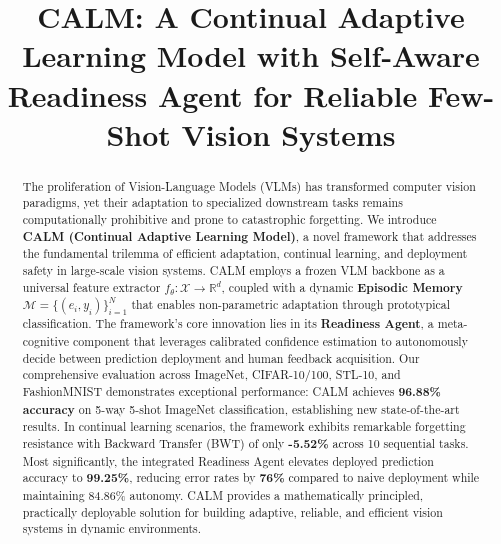 \documentclass[conference]{IEEEtran}
\begin{document}
\title{CALM: A Continual Adaptive Learning Model with Self-Aware Readiness Agent for Reliable Few-Shot Vision Systems}

\author{
\and
{}
}

\maketitle

\begin{abstract}
The proliferation of Vision-Language Models (VLMs) has transformed computer vision paradigms, yet their adaptation to specialized downstream tasks remains computationally prohibitive and prone to catastrophic forgetting. We introduce \textbf{CALM (Continual Adaptive Learning Model)}, a novel framework that addresses the fundamental trilemma of efficient adaptation, continual learning, and deployment safety in large-scale vision systems. CALM employs a frozen VLM backbone as a universal feature extractor $f_\theta: \mathcal{X} \rightarrow \mathbb{R}^d$, coupled with a dynamic \textbf{Episodic Memory} $\mathcal{M} = \{(e_i, y_i)\}_{i=1}^N$ that enables non-parametric adaptation through prototypical classification. The framework's core innovation lies in its \textbf{Readiness Agent}, a meta-cognitive component that leverages calibrated confidence estimation to autonomously decide between prediction deployment and human feedback acquisition. Our comprehensive evaluation across ImageNet, CIFAR-10/100, STL-10, and FashionMNIST demonstrates exceptional performance: CALM achieves \textbf{96.88\% accuracy} on 5-way 5-shot ImageNet classification, establishing new state-of-the-art results. In continual learning scenarios, the framework exhibits remarkable forgetting resistance with Backward Transfer (BWT) of only \textbf{-5.52\%} across 10 sequential tasks. Most significantly, the integrated Readiness Agent elevates deployed prediction accuracy to \textbf{99.25\%}, reducing error rates by \textbf{76\%} compared to naive deployment while maintaining 84.86\% autonomy. CALM provides a mathematically principled, practically deployable solution for building adaptive, reliable, and efficient vision systems in dynamic environments.
\end{abstract}
\end{document}
